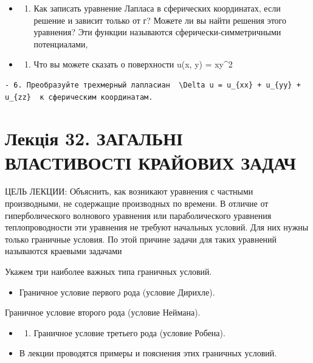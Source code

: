 \documentclass[
  ukrainian,
]{article}
\providecommand{\tightlist}{%
  \setlength{\itemsep}{0pt}\setlength{\parskip}{0pt}}
\begin{document}
\begin{itemize}
\tightlist
\item
  \begin{enumerate}
  \def\labelenumi{\arabic{enumi}.}
  \setcounter{enumi}{3}
  \tightlist
  \item
    Как записать уравнение Лапласа в сферических координатах, если
    решение и зависит только от г? Можете ли вы найти решения этого
    уравнения? Эти функции называются сферически-симметричными
    потенциалами,
  \end{enumerate}
\item
  \begin{enumerate}
  \def\labelenumi{\arabic{enumi}.}
  \setcounter{enumi}{4}
  \tightlist
  \item
    Что вы можете сказать о поверхности u(x, y) = xy\^{}2
  \end{enumerate}
\end{itemize}

\begin{verbatim}
- 6. Преобразуйте трехмерный лапласиан  \Delta u = u_{xx} + u_{yy} + u_{zz}  к сферическим координатам.
\end{verbatim}

\section{Лекція 32. ЗАГАЛЬНІ ВЛАСТИВОСТІ КРАЙОВИХ
ЗАДАЧ}\label{ux43bux435ux43aux446ux456ux44f-32.-ux437ux430ux433ux430ux43bux44cux43dux456-ux432ux43bux430ux441ux442ux438ux432ux43eux441ux442ux456-ux43aux440ux430ux439ux43eux432ux438ux445-ux437ux430ux434ux430ux447}

ЦЕЛЬ ЛЕКЦИИ: Объяснить, как возникают уравнения с частными производными,
не содержащие производных по времени. В отличие от гиперболического
волнового уравнения или параболического уравнения теплопроводности эти
уравнения не требуют начальных условий. Для них нужны только граничные
условия. По этой причине задачи для таких уравнений называются краевыми
задачами

Укажем три наиболее важных типа граничных условий.

\begin{itemize}
\tightlist
\item
  Граничное условие первого рода (условие Дирихле).
\end{itemize}

Граничное условие второго рода (условие Неймана).

\begin{itemize}
\tightlist
\item
  \begin{enumerate}
  \def\labelenumi{\arabic{enumi}.}
  \setcounter{enumi}{2}
  \tightlist
  \item
    Граничное условие третьего рода (условие Робена).
  \end{enumerate}
\item
  В лекции проводятся примеры и пояснения этих граничных условий.
\end{itemize}
\end{document}
